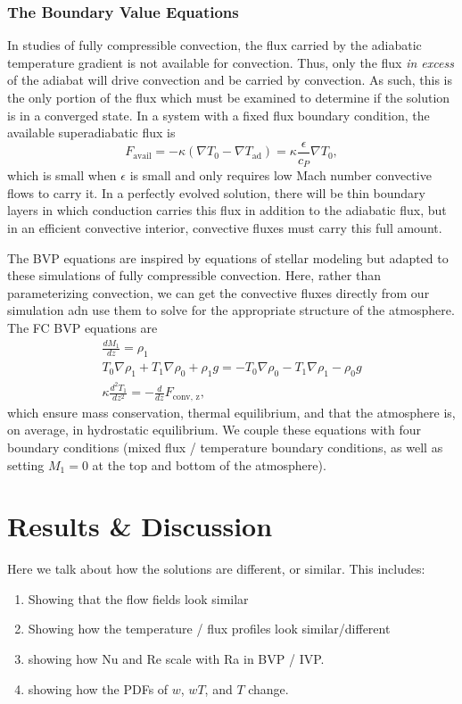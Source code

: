 \documentclass[aps, pre, onecolumn, nofootinbib, notitlepage, groupedaddress, amsfonts, amssymb, amsmath, longbibliography]{revtex4-1}
\newcommand{\grad}{\ensuremath{\nabla}}
\begin{document}
\subsubsection{The Boundary Value Equations}
In studies of fully compressible convection, the flux carried by the adiabatic temperature gradient
is not available for convection.  Thus, only the flux \emph{in excess} of the adiabat will drive
convection and be carried by convection.  As such, this is the only portion of the flux which
must be examined to determine if the solution is in a converged state.  In a system with
a fixed flux boundary condition, the available superadiabatic flux is
\begin{equation}
F_{\text{avail}} = -\kappa(\grad T_0 - \grad T_{\text{ad}}) = \kappa\frac{\epsilon}{c_P}\grad T_0,
\end{equation}
which is small when $\epsilon$ is small and only requires low Mach number convective flows
to carry it.  In a perfectly evolved solution, there will be thin boundary layers in which
conduction carries this flux in addition to the adiabatic flux, but in an efficient convective
interior, convective fluxes must carry this full amount.

The BVP equations are inspired by equations of stellar modeling  \cite{paxton&all2011} but adapted to these simulations
of fully compressible convection.  Here, rather than parameterizing convection, we can get the
convective fluxes directly from our simulation adn use them to solve for the appropriate structure
of the atmosphere.  The FC BVP equations are
\begin{gather}
\frac{d M_1}{dz} = \rho_1 \\
T_0 \grad \rho_1 + T_1 \grad \rho_0 + \rho_1 g = - T_0 \grad \rho_0 - T_1 \grad \rho_1 - \rho_0 g \\
\kappa \frac{d^2 T_1}{d z^2} = -\frac{d}{dz}F_{\text{conv, z}},
\end{gather}
which ensure mass conservation, thermal equilibrium, and that the atmosphere is, on average,
in hydrostatic equilibrium.  We couple these equations with four boundary conditions (mixed
flux / temperature boundary conditions, as well as setting $M_1 = 0$ at the top and bottom
of the atmosphere).





\section{Results \& Discussion}
\label{sec:results}
Here we talk about how the solutions are different, or similar.  This includes:
\begin{enumerate}
\item Showing that the flow fields look similar
\item Showing how the temperature / flux profiles look similar/different
\item showing how Nu and Re scale with Ra in BVP / IVP.
\item showing how the PDFs of $w$, $wT$, and $T$ change.
\end{enumerate}
\end{document}
